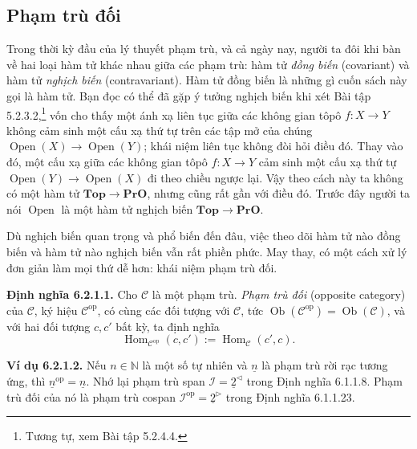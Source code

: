 \subsection{Phạm trù đối}
Trong thời kỳ đầu của lý thuyết phạm trù, và cả ngày nay, người ta đôi khi bàn về hai loại hàm tử khác nhau giữa các phạm trù: hàm tử \emph{đồng biến} (covariant) và hàm tử \emph{nghịch biến} (contravariant). Hàm tử đồng biến là những gì cuốn sách này gọi là hàm tử. Bạn đọc có thể đã gặp ý tưởng nghịch biến khi xét Bài tập 5.2.3.2,\footnote{Tương tự, xem Bài tập 5.2.4.4.} vốn cho thấy một ánh xạ liên tục giữa các không gian tôpô $f:X\to Y$ không cảm sinh một cấu xạ thứ tự trên các tập mở của chúng $\operatorname{Open}(X)\to\operatorname{Open}(Y)$; khái niệm liên tục không đòi hỏi điều đó. Thay vào đó, một cấu xạ giữa các không gian tôpô $f:X\to Y$ cảm sinh một cấu xạ thứ tự $\operatorname{Open}(Y)\to\operatorname{Open}(X)$ đi theo chiều ngược lại. Vậy theo cách này ta không có một hàm tử $\mathbf{Top}\to\mathbf{PrO}$,
nhưng cũng rất gần với điều đó. Trước đây người ta nói $\operatorname{Open}$ là một hàm tử nghịch biến $\mathbf{Top}\to\mathbf{PrO}$.

Dù nghịch biến quan trọng và phổ biến đến đâu, việc theo dõi hàm tử nào đồng biến và hàm tử nào nghịch biến vẫn rất phiền phức. May thay, có một cách xử lý đơn giản làm mọi thứ dễ hơn: khái niệm phạm trù đối.

\noindent\textbf{Định nghĩa 6.2.1.1.} Cho $\mathcal C$ là một phạm trù. \emph{Phạm trù đối} (opposite category) của $\mathcal C$, ký hiệu $\mathcal C^{\mathrm{op}}$, có cùng các đối tượng với $\mathcal C$, tức $\operatorname{Ob}(\mathcal C^{\mathrm{op}})=\operatorname{Ob}(\mathcal C)$, và với hai đối tượng $c,c'$ bất kỳ, ta định nghĩa
\[\operatorname{Hom}_{\mathcal C^{\mathrm{op}}}(c,c'):=\operatorname{Hom}_{\mathcal C}(c',c).\]

\noindent\textbf{Ví dụ 6.2.1.2.} Nếu $n\in\mathbb N$ là một số tự nhiên và $\underline n$ là phạm trù rời rạc tương ứng, thì $\underline n^{\mathrm{op}}=\underline n$. Nhớ lại phạm trù span $\mathcal I=\underline2^{\triangleleft}$ trong Định nghĩa 6.1.1.8. Phạm trù đối của nó là phạm trù cospan $\mathcal I^{\mathrm{op}}=\underline2^{\triangleright}$ trong Định nghĩa 6.1.1.23.

